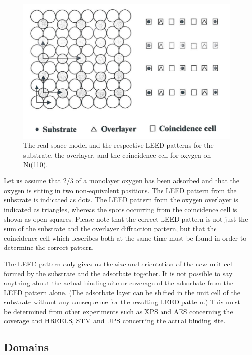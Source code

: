 \begin{figure}[h!]
	\begin{center}
	\includegraphics[scale=4]{figures/09_12.png}
	\caption{The real space model and the respective LEED patterns for the substrate, the overlayer, and the coincidence cell for oxygen on Ni(110).}
	\label{fig:onileed}
	\end{center}
\end{figure}

Let us assume that 2/3 of a monolayer oxygen has been adsorbed and that the oxygen is sitting in two non-equivalent positions. The LEED pattern from the substrate is indicated as dots. The LEED pattern from the oxygen overlayer is indicated as triangles, whereas the spots occurring from the coincidence cell is shown as open squares. Please note that the correct LEED pattern is not just the sum of the substrate and the overlayer diffraction pattern, but that the coincidence cell which describes both at the same time must be found in order to determine the correct pattern.

The LEED pattern only gives us the size and orientation of the new unit cell  formed by the substrate and the adsorbate together. It is not possible to say anything about the actual binding site or coverage of the adsorbate from the LEED pattern alone. (The adsorbate layer can be shifted in the unit cell of the substrate without any consequence for the resulting LEED pattern.) This must be determined from other experiments such as XPS and AES concerning the coverage and HREELS, STM and UPS concerning the actual binding site.

\subsection{Domains}

